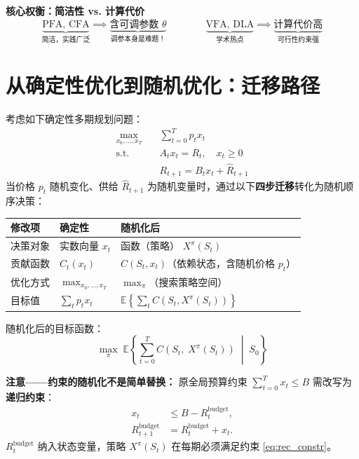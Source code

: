 \documentclass[11pt, a4paper]{article}
\begin{document}
\begin{tcolorbox}[formulabox]
\textbf{核心权衡：简洁性 vs. 计算代价}
\[
  \underbrace{\text{PFA, CFA}}_{\text{简洁，实践广泛}} \implies \underbrace{\text{含可调参数 } \theta}_{\text{调参本身是难题！}}
\qquad\qquad
  \underbrace{\text{VFA, DLA}}_{\text{学术热点}} \implies \underbrace{\text{计算代价高}}_{\text{可行性约束强}}
\]
\end{tcolorbox}

\section{从确定性优化到随机优化：迁移路径}
\label{sec:det2sto}

考虑如下确定性多期规划问题：
\begin{align}
  \max_{x_0, \ldots, x_T}\quad & \sum_{t=0}^{T} p_t x_t \label{eq:det_obj} \\
  \text{s.t.}\quad & A_t x_t = R_t,\quad x_t \geq 0 \\
  & R_{t+1} = B_t x_t + \hat{R}_{t+1}
\end{align}
当价格 $p_t$ 随机变化、供给 $\hat{R}_{t+1}$ 为随机变量时，通过以下\textbf{四步迁移}转化为随机顺序决策：

\begin{center}
\begin{tabular}{lll}
\toprule
\textbf{修改项} & \textbf{确定性} & \textbf{随机化后} \\
\midrule
决策对象 & 实数向量 $x_t$ & 函数（策略） $X^\pi(S_t)$ \\
贡献函数 & $C_t(x_t)$ & $C(S_t, x_t)$（依赖状态，含随机价格 $p_t$） \\
优化方式 & $\max_{x_0,\ldots,x_T}$ & $\max_\pi$（搜索策略空间） \\
目标值 & $\sum_t p_t x_t$ & $\mathbb{E}\!\left\{\sum_t C(S_t, X^\pi(S_t))\right\}$ \\
\bottomrule
\end{tabular}
\end{center}

随机化后的目标函数：
\begin{equation}
  \max_{\pi}\; \mathbb{E}\!\left\{
    \sum_{t=0}^{T} C(S_t,\; X^\pi(S_t)) \;\middle|\; S_0
  \right\}
  \label{eq:sto_final}
\end{equation}

\noindent\textbf{注意——约束的随机化不是简单替换：} 原全局预算约束 $\sum_{t=0}^T x_t \leq B$ 需改写为\textbf{递归约束}：
\begin{align}
  x_t &\leq B - R_t^{\text{budget}}, \label{eq:rec_constr} \\
  R_{t+1}^{\text{budget}} &= R_t^{\text{budget}} + x_t. \label{eq:rec_update}
\end{align}
$R_t^{\text{budget}}$ 纳入状态变量，策略 $X^\pi(S_t)$ 在每期必须满足约束 \eqref{eq:rec_constr}。
\end{document}
